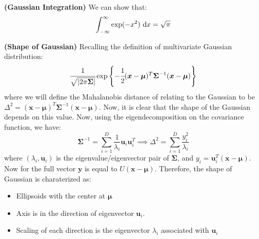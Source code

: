 \begin{proposition}{\textbf{(Gaussian Integration)}}
    We can show that:
    \begin{equation*}
        \int^\infty_{-\infty}\exp(-x^2)\ \mathrm{d} x = \sqrt{\pi}
    \end{equation*}
\end{proposition}

\begin{remark}{\textbf{(Shape of Gaussian)}}
    Recalling the definition of multivariate Gaussian distribution:
    \begin{equation*}
        \cfrac{1}{\sqrt{\left| 2\pi \boldsymbol \Sigma \right|}}\exp\left\{ -\cfrac{1}{2}(\boldsymbol x-\boldsymbol \mu)^T\boldsymbol \Sigma^{-1}(\boldsymbol x-\boldsymbol \mu)  \right\}
    \end{equation*}
    where we will define the Mahalanobis distance of relating to the Gaussian to be $\Delta^2 = (\boldsymbol x-\boldsymbol \mu)^T\boldsymbol \Sigma^{-1}(\boldsymbol x-\boldsymbol \mu)$. Now, it is clear that the shape of the Gaussian depends on this value. Now, using the eigendecomposition on the covariance function, we have:
    \begin{equation*}
        \boldsymbol \Sigma^{-1} = \sum^D_{i=1}\frac{1}{\lambda_i}\boldsymbol u_i\boldsymbol u_i^T \implies \Delta^2 = \sum^D_{i=1}\frac{y_i^2}{\lambda_i}
    \end{equation*}
    where $(\lambda_i, \boldsymbol u_i)$ is the eigenvalue/eigenvector pair of $\boldsymbol \Sigma$, and $y_i = \boldsymbol u_i^T(\boldsymbol x-\boldsymbol \mu)$. Now for the full vector $\boldsymbol y$ is equal to $U(\boldsymbol x-\boldsymbol \mu)$. Therefore, the shape of Gaussian is charaterized as:
    \begin{itemize}
        \item Ellipsoids with the center at $\boldsymbol \mu$
        \item Axis is in the direction of eigenvector $\boldsymbol u_i$.
        \item Scaling of each direction is the eigenvector $\lambda_i$ associated with $\boldsymbol u_i$
    \end{itemize}
\end{remark}

